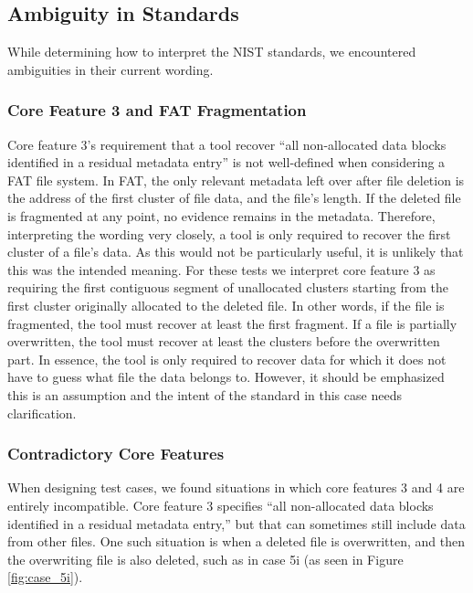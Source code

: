 \subsection{Ambiguity in Standards}
While determining how to interpret the NIST standards, we encountered ambiguities in their current wording.

\subsubsection{Core Feature 3 and FAT Fragmentation}
Core feature 3's requirement that a tool recover ``all non-allocated data blocks identified in a residual metadata entry''\cite{meta:dfr:standards} is not well-defined when considering a FAT file system. 
In FAT, the only relevant metadata left over after file deletion is the address of the first cluster of file data, and the file's length. 
If the deleted file is fragmented at any point, no evidence remains in the metadata. 
Therefore, interpreting the wording very closely, a tool is only required to recover the first cluster of a file's data. 
As this would not be particularly useful, it is unlikely that this was the intended meaning. 
For these tests we interpret core feature 3 as requiring the first contiguous segment of unallocated clusters starting from the first cluster originally allocated to the deleted file. 
In other words, if the file is fragmented, the tool must recover at least the first fragment. 
If a file is partially overwritten, the tool must recover at least the clusters before the overwritten part.
In essence, the tool is only required to recover data for which it does not have to guess what file the data belongs to.
However, it should be emphasized this is an assumption and the intent of the standard in this case needs clarification.

\subsubsection{Contradictory Core Features}
When designing test cases, we found situations in which core features 3 and 4 are entirely incompatible. 
Core feature 3 specifies ``all non-allocated data blocks identified in a residual metadata entry,''\cite{meta:dfr:standards} but that can sometimes still include data from other files. 
One such situation is when a deleted file is overwritten, and then the overwriting file is also deleted, such as in case 5i (as seen in Figure \ref{fig:case_5i}).

